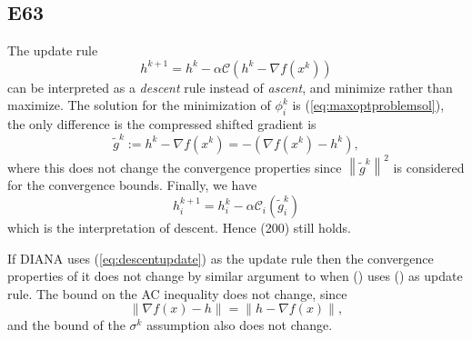 \documentclass[12pt]{article}
\begin{document}
\subsection*{E63}
The update rule
\begin{equation}
    h^{k+1} = h^k - \alpha \mathcal{C}(h^k-\nabla f(x^k))
    \label{eq:descentupdate}
\end{equation}
can be interpreted as a \textit{descent} rule instead of \textit{ascent}, and minimize rather than maximize. The solution for the minimization of $\phi_i^k$ is (\ref{eq:maxoptproblemsol}), the only difference is the compressed shifted gradient is
\begin{equation*}
	\tilde{g}^k:= h^k - \nabla f(x^k) = -(\nabla f(x^k) - h^k),
\end{equation*}
where this does not change the convergence properties since $\left\|\tilde{g}^k\right\|^2$ is considered for the convergence bounds. Finally, we have
\begin{equation*}
	h_i^{k+1} = h_i^k - \alpha \mathcal{C}_i(\tilde{g}_i^k)
\end{equation*}
which is the interpretation of descent. Hence (200) still holds.

If DIANA uses (\ref{eq:descentupdate}) as the update rule then the convergence properties of it does not change by similar argument to when () uses () as update rule. The bound on the AC inequality does not change, since
\begin{equation*}
	\left\| \nabla f(x) - h \right\| = \left\| h - \nabla f(x) \right\|,
\end{equation*}
and the bound of the $\sigma^k$ assumption also does not change.
\end{document}
